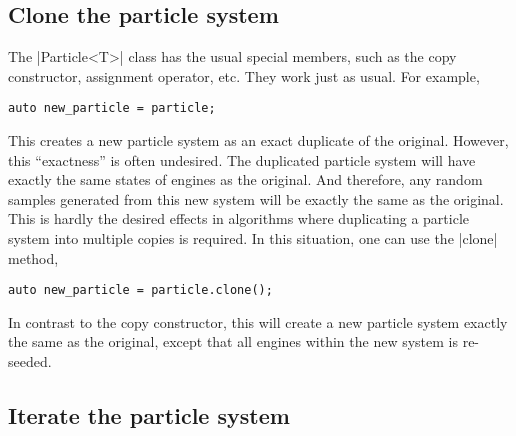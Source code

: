 \subsection{Clone the particle system}
\label{sub:Clone the particle system}

The |Particle<T>| class has the usual special members, such as the copy
constructor, assignment operator, etc. They work just as usual. For example,
\begin{verbatim}
auto new_particle = particle;
\end{verbatim}
This creates a new particle system as an exact duplicate of the original.
However, this ``exactness'' is often undesired. The duplicated particle system
will have exactly the same states of \rng engines as the original. And
therefore, any random samples generated from this new system will be exactly
the same as the original. This is hardly the desired effects in algorithms
where duplicating a particle system into multiple copies is required. In this
situation, one can use the |clone| method,
\begin{verbatim}
auto new_particle = particle.clone();
\end{verbatim}
In contrast to the copy constructor, this will create a new particle system
exactly the same as the original, except that all \rng engines within the new
system is re-seeded.

\subsection{Iterate the particle system}
\label{sub:Iterate the particle system}

